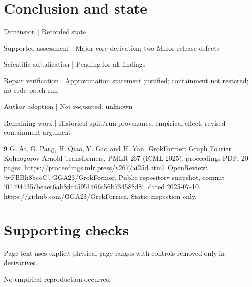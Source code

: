 \documentclass[10pt]{article}
\begin{document}
\section*{Conclusion and state}
Dimension | Recorded state\par
Supported assessment | Major core derivation; two Minor release defects\par
Scientific adjudication | Pending for all findings\par
Repair verification | Approximation statement justified; containment not restored; no code patch run\par
Author adoption | Not requested; unknown\par
Remaining work | Historical split/run provenance, empirical effect, revised containment argument\par
9 G. Ai, G. Pang, H. Qiao, Y. Gao and H. Yan. GrokFormer: Graph Fourier Kolmogorov-Arnold Transformers. PMLR 267 (ICML 2025), proceedings PDF, 20 pages. https://proceedings.mlr.press/v267/ai25d.html. OpenReview: `wFBBh8bcoC`. GGA23/GrokFormer. Public repository snapshot, commit `014944357beaec6ab8dc45951466c56b734588d8`, dated 2025-07-10. https://github.com/GGA23/GrokFormer. Static inspection only.\par
\section*{Supporting checks}
Page text uses explicit physical-page ranges with controls removed only in derivatives.\par
No empirical reproduction occurred.\par
\end{document}

